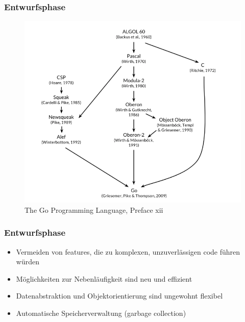 \documentclass{beamer}
\begin{document}
\begin{frame}
\frametitle{Entwurfsphase}

\begin{figure}
\centering
\includegraphics[scale=0.45]{origin.png}
\caption{The Go Programming Language,  Preface xii}
\end{figure}

\end{frame}

\begin{frame}
\frametitle{Entwurfsphase}

\begin{itemize}
\setlength{\itemsep}{40pt}
\item Vermeiden von features, die zu komplexen, unzuverl\"assigen code führen w\"urden
\item M\"oglichkeiten zur Nebenl\"aufigkeit sind neu und effizient
\item Datenabstraktion und Objektorientierung sind ungewohnt flexibel
\item Automatische Speicherverwaltung (garbage collection)
\end{itemize}

\end{frame}

\end{document}
